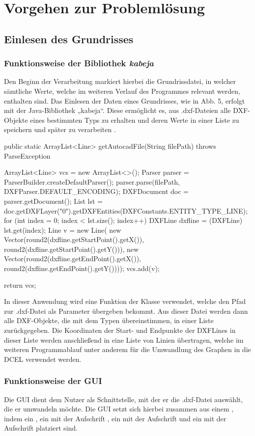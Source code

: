 \chapter{Vorgehen zur Problemlösung}
\section{Einlesen des Grundrisses}
\subsection{Funktionsweise der Bibliothek \textit{kabeja}}
Den Beginn der Verarbeitung markiert hierbei die Grundrissdatei, in welcher sämtliche Werte, welche im weiteren Verlauf des Programmes relevant werden, enthalten sind.
Das Einlesen der Daten eines Grundrisses, wie in Abb. 5, erfolgt mit der Java-Bibliothek „kabeja“. 
Diese ermöglicht es, aus .dxf-Dateien alle DXF-Objekte eines bestimmten Typs zu erhalten und deren Werte in einer Liste zu speichern und später zu verarbeiten \cite{kabeja}.
\begin{code}
public static ArrayList<Line> getAutocadFile(String filePath) throws ParseException {
	ArrayList<Line> vcs = new ArrayList<>();
	Parser parser = ParserBuilder.createDefaultParser();
	parser.parse(filePath, DXFParser.DEFAULT_ENCODING);
	DXFDocument doc = parser.getDocument();
	List lst = doc.getDXFLayer("0").getDXFEntities(DXFConstants.ENTITY_TYPE_LINE);
	for (int index = 0; index < lst.size(); index++) {
		DXFLine dxfline = (DXFLine) lst.get(index);
		Line v = new Line(
		new Vector(round2(dxfline.getStartPoint().getX()), round2(dxfline.getStartPoint().getY())),
		new Vector(round2(dxfline.getEndPoint().getX()), round2(dxfline.getEndPoint().getY())));
		vcs.add(v);
	}
	
	return vcs;
}
\end{code}
In dieser Anwendung wird eine Funktion der Klasse  verwendet, welche den Pfad zur .dxf-Datei als Parameter übergeben bekommt. 
Aus dieser Datei werden dann alle DXF-Objekte, die mit dem Typen  übereinstimmen, in einer Liste zurückgegeben. 
Die Koordinaten der Start- und Endpunkte der DXFLines  in dieser Liste werden anschließend in eine Liste von Linien übertragen, welche im weiteren Programmablauf unter anderem für die Umwandlung des Graphen in die DCEL verwendet werden.

\subsection{Funktionsweise der GUI}
Die GUI dient dem Nutzer als Schnittstelle, mit der er die .dxf-Datei auswählt, die er umwandeln möchte.
Die GUI setzt sich hierbei zusammen aus einem , indem ein , ein  mit der Aufschrift , ein  mit der Aufschrift  und ein  mit der Aufschrift  platziert sind.

